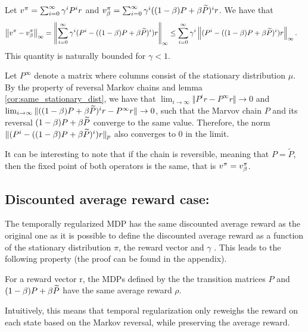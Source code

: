 \begin{proposition}
Let $v^{\pi} = \sum_{i=0}^{\infty} \gamma^i P^i r$ and $v^{\pi}_{\beta} = \sum_{i=0}^{\infty} \gamma^i ((1-\beta) P + \beta \widetilde{P})^i r$. We have that
\begin{equation}
    \begin{split}
        \left\lVert v^{\pi} - v^{\pi}_{\beta}\right\rVert_{\infty} &= \left\lVert\sum_{i=0}^{\infty} \gamma^i (P^i-((1-\beta) P + \beta \widetilde{P})^i) r\right\rVert_{\infty}
        \leq \sum_{i=0}^{\infty} \gamma^i \left\lVert (P^i-((1-\beta) P + \beta \widetilde{P})^i) r\right\rVert_{\infty}.
    \end{split}
\end{equation}
This quantity is naturally bounded for $\gamma < 1$.
\end{proposition}
\begin{remark}
Let $P^\infty$ denote a matrix where columns consist of the stationary distribution $\mu$.
By the property of reversal Markov chains and lemma \ref{cor:same_stationary_dist}, we have that $\lim_{i\rightarrow\infty} \Vert P^i r-P^\infty r \Vert \rightarrow 0$ and $\lim_{i\rightarrow\infty} \Vert ((1-\beta)P+\beta \widetilde{P})^i r-P^\infty r \Vert \rightarrow 0$, such that the Marvov chain $P$ and its reversal $(1-\beta)P+\beta \widetilde{P}$ converge to the same value. Therefore, the norm $\Vert  (P^i-((1-\beta) P + \beta \widetilde{P})^i) r \Vert_p$ also converges to 0 in the limit.
\end{remark}

\begin{remark}
It can be interesting to note that if the chain is reversible, meaning that $P = \widetilde{P}$, then the fixed point of both operators is the same, that is $v^\pi = v_\beta^\pi$.
\end{remark}

\subsection{Discounted average reward case:} The temporally regularized MDP has the same discounted average reward as the original one as it is possible to define the discounted average reward \cite{tsitsiklis2002average} as a function of the stationary distribution $\pi$, the reward vector and $\gamma$ . This leads to the following property (the proof can be found in the appendix).

\begin{proposition}
For a reward vector r, the MDPs defined by the the transition matrices $P$ and $(1-\beta) P + \beta \widetilde{P}$ have the same average reward $\rho$.
\end{proposition}
Intuitively, this means that temporal regularization only reweighs the reward on each state based on the Markov reversal, while preserving the average reward.

